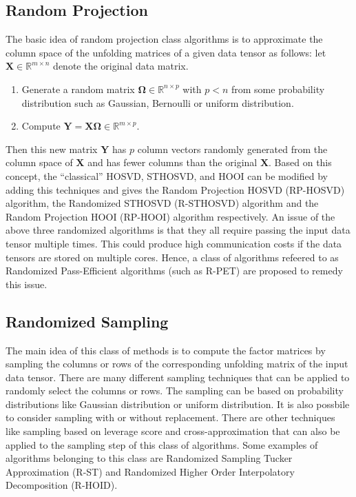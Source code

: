 \documentclass[preprint]{elsarticle}
\begin{document}
\subsection{Random Projection}
\noindent The basic idea of random projection class algorithms is to approximate the column space of the unfolding matrices of a given data tensor
as follows: let $\mathbf{X}\in\mathbb{R}^{m\times n}$ denote the original data matrix.
\begin{enumerate}
    \item Generate a random matrix $\mathbf{\Omega}\in\mathbb{R}^{n\times p}$ with $p<n$ from some probability distribution such as 
    Gaussian, Bernoulli or uniform distribution.
    \item Compute $\mathbf{Y}=\mathbf{X}\mathbf{\Omega}\in\mathbb{R}^{m\times p}$.
\end{enumerate}
Then this new matrix $\mathbf{Y}$ has $p$ column vectors randomly generated from the column space of $\mathbf{X}$ and has 
fewer columns than the original $\mathbf{X}$.
\vskip 0.3cm
\noindent Based on this concept, the ``classical'' HOSVD, STHOSVD, and HOOI can be modified by adding this techniques and gives
the Random Projection HOSVD (RP-HOSVD) algorithm, the Randomized STHOSVD (R-STHOSVD) algorithm and the Random Projection HOOI (RP-HOOI)
algorithm respectively. An issue of the above three randomized algorithms is that they all require passing the input data tensor multiple times.
This could produce high communication costs if the data tensors are stored on multiple cores. Hence, a class of algorithms refeered to as
Randomized Pass-Efficient algorithms (such as R-PET) are proposed to remedy this issue.
\subsection{Randomized Sampling}
\noindent The main idea of this class of methods is to compute the factor matrices by sampling the columns or rows
of the corresponding unfolding matrix of the input data tensor. There are many different sampling techniques that can
be applied to randomly select the columns or rows. The sampling can be based on probability distributions like
Gaussian distribution or uniform distribution. It is also possbile to consider sampling with or without replacement.
There are other techniques like sampling based on leverage score and cross-approximation that can also be applied to the
sampling step of this class of algorithms. Some examples of algorithms belonging to this class are
Randomized Sampling Tucker Approximation (R-ST) and Randomized Higher Order Interpolatory Decomposition (R-HOID).
\end{document}
